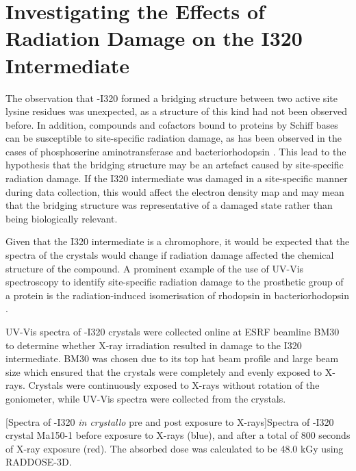 \chapter{Investigating the Effects of Radiation Damage on the I320 Intermediate}\label{ch:multi_xtal}

The observation that \atpdx -I320 formed a bridging structure between two active site lysine residues was unexpected, as a structure of this kind had not been observed before. In addition, compounds and cofactors bound to proteins by Schiff bases can be susceptible to site-specific radiation damage, as has been observed in the cases of phosphoserine aminotransferase and bacteriorhodopsin \cite{Dubnovitsky2005,Borshchevskiy2011,Borshchevskiy2014}. This lead to the hypothesis that the bridging structure may be an artefact caused by site-specific radiation damage. If the I320 intermediate was damaged in a site-specific manner during data collection, this would affect the electron density map and may mean that the bridging structure was representative of a damaged state rather than being biologically relevant.

Given that the I320 intermediate is a chromophore, it would be expected that the spectra of the crystals would change if radiation damage affected the chemical structure of the compound. A prominent example of the use of UV-Vis spectroscopy to identify site-specific radiation damage to the prosthetic group of a protein is the radiation-induced isomerisation of rhodopsin in bacteriorhodopsin \cite{Matsui2002,Borshchevskiy2011}. 

UV-Vis spectra of \atpdx -I320 crystals were collected online at ESRF beamline BM30 to determine whether X-ray irradiation resulted in damage to the I320 intermediate. BM30 was chosen due to its top hat beam profile and large beam size which ensured that the crystals were completely and evenly exposed to X-rays. Crystals were continuously exposed to X-rays without rotation of the goniometer, while UV-Vis spectra were collected from the crystals. 

\begin{minipage}{\linewidth}
	[Spectra of \atpdx -I320 \textit{in crystallo} pre and post exposure to X-rays]{Spectra of \atpdx -I320 crystal Ma150-1 before exposure to X-rays (blue), and after a total of 800 seconds of X-ray exposure (red). The absorbed dose was calculated to be 48.0 \si{\kilo\gray} using RADDOSE-3D.\label{fig:Ma150-1_I320_pre_20}}	
\end{minipage}

